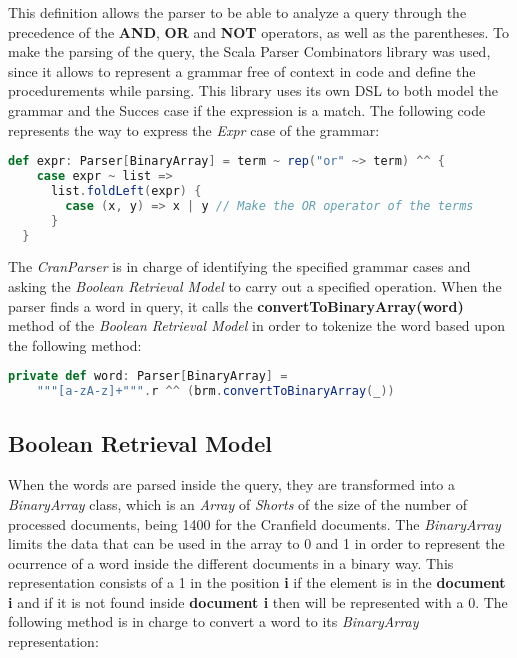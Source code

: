 \documentclass{article}
\begin{document}
This definition allows the parser to be able to analyze a query through the precedence of the \textbf{AND}, \textbf{OR} and \textbf{NOT} operators, as well as the parentheses. To make the parsing of the query, the Scala Parser Combinators library was used, since it allows to represent a grammar free of context in code and define the procedurements while parsing. This library uses its own DSL to both model the grammar and the Succes case if the expression is a match. The following code represents the way to express the \textit{Expr} case of the grammar:

\begin{lstlisting}[language=Scala]
def expr: Parser[BinaryArray] = term ~ rep("or" ~> term) ^^ {
    case expr ~ list =>
      list.foldLeft(expr) {
        case (x, y) => x | y // Make the OR operator of the terms
      }
  }
		\end{lstlisting}

The \textit{CranParser} is in charge of identifying the specified grammar cases and asking the \textit{Boolean Retrieval Model} to carry out a specified operation. When the parser finds a word in query, it calls the \textbf{convertToBinaryArray(word)} method of the \textit{Boolean Retrieval Model} in order to tokenize the word based upon the following method:

\begin{lstlisting}[language=Scala]
private def word: Parser[BinaryArray] =
    """[a-zA-z]+""".r ^^ (brm.convertToBinaryArray(_))
			\end{lstlisting}

\subsection{Boolean Retrieval Model}

When the words are parsed inside the query, they are transformed into a \textit{BinaryArray} class, which is an \textit{Array} of \textit{Shorts} of the size of the number of processed documents, being 1400 for the Cranfield documents. The \textit{BinaryArray} limits the data that can be used in the array to 0 and 1 in order to represent the ocurrence of a word inside the different documents in a binary way. This representation consists of a 1 in the position \textbf{i} if the element is in the \textbf{document i} and if it is not found inside \textbf{document i} then will be represented with a 0. The following method is in charge to convert a word to its \textit{BinaryArray} representation:
\end{document}
